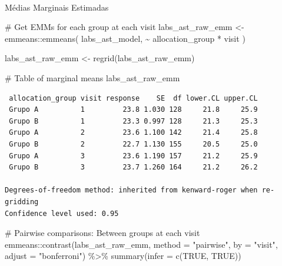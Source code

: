 \documentclass[
  letterpaper,
  DIV=11,
  numbers=noendperiod]{scrartcl}
\makeatletter
\let\oldparagraph\paragraph
\renewcommand{\paragraph}{
    \@ifstar
      \xxxParagraphStar
      \xxxParagraphNoStar
  }
\newcommand{\xxxParagraphStar}[1]{\oldparagraph*{#1}\mbox{}}
\newcommand{\xxxParagraphNoStar}[1]{\oldparagraph{#1}\mbox{}}
\newenvironment{Shaded}{\begin{snugshade}}{\end{snugshade}}
\newcommand{\AttributeTok}[1]{\textcolor[rgb]{0.40,0.45,0.13}{#1}}
\newcommand{\CommentTok}[1]{\textcolor[rgb]{0.37,0.37,0.37}{#1}}
\newcommand{\ConstantTok}[1]{\textcolor[rgb]{0.56,0.35,0.01}{#1}}
\newcommand{\FunctionTok}[1]{\textcolor[rgb]{0.28,0.35,0.67}{#1}}
\newcommand{\NormalTok}[1]{\textcolor[rgb]{0.00,0.23,0.31}{#1}}
\newcommand{\OtherTok}[1]{\textcolor[rgb]{0.00,0.23,0.31}{#1}}
\newcommand{\SpecialCharTok}[1]{\textcolor[rgb]{0.37,0.37,0.37}{#1}}
\newcommand{\StringTok}[1]{\textcolor[rgb]{0.13,0.47,0.30}{#1}}
\makeatother
\begin{document}
\paragraph{Médias Marginais
Estimadas}\label{muxe9dias-marginais-estimadas}

\begin{Shaded}
\begin{Highlighting}[]
\CommentTok{\# Get EMMs for each group at each visit}
\NormalTok{labs\_ast\_raw\_emm }\OtherTok{\textless{}{-}}\NormalTok{ emmeans}\SpecialCharTok{::}\FunctionTok{emmeans}\NormalTok{(}
\NormalTok{    labs\_ast\_model, }
    \SpecialCharTok{\textasciitilde{}}\NormalTok{ allocation\_group }\SpecialCharTok{*}\NormalTok{ visit}
\NormalTok{)}

\NormalTok{labs\_ast\_raw\_emm }\OtherTok{\textless{}{-}} \FunctionTok{regrid}\NormalTok{(labs\_ast\_raw\_emm)}

\CommentTok{\# Table of marginal means}
\NormalTok{labs\_ast\_raw\_emm}
\end{Highlighting}
\end{Shaded}

\begin{verbatim}
 allocation_group visit response    SE  df lower.CL upper.CL
 Grupo A          1         23.8 1.030 128     21.8     25.9
 Grupo B          1         23.3 0.997 128     21.3     25.3
 Grupo A          2         23.6 1.100 142     21.4     25.8
 Grupo B          2         22.7 1.130 155     20.5     25.0
 Grupo A          3         23.6 1.190 157     21.2     25.9
 Grupo B          3         23.7 1.260 164     21.2     26.2

Degrees-of-freedom method: inherited from kenward-roger when re-gridding 
Confidence level used: 0.95 
\end{verbatim}

\begin{Shaded}
\begin{Highlighting}[]
\CommentTok{\# Pairwise comparisons: Between groups at each visit}
\NormalTok{emmeans}\SpecialCharTok{::}\FunctionTok{contrast}\NormalTok{(labs\_ast\_raw\_emm, }\AttributeTok{method =} \StringTok{"pairwise"}\NormalTok{, }\AttributeTok{by =} \StringTok{"visit"}\NormalTok{, }\AttributeTok{adjust =} \StringTok{"bonferroni"}\NormalTok{) }\SpecialCharTok{\%\textgreater{}\%} \FunctionTok{summary}\NormalTok{(}\AttributeTok{infer =} \FunctionTok{c}\NormalTok{(}\ConstantTok{TRUE}\NormalTok{, }\ConstantTok{TRUE}\NormalTok{))}
\end{Highlighting}
\end{Shaded}
\end{document}
